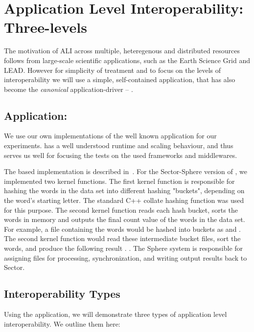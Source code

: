 \documentclass[3p,twocolumn]{elsarticle}
\begin{document}
\section{Application Level Interoperability: Three-levels}
\label{sec:interop}

The motivation of ALI across multiple, heteregenous and distributed
resources follows from large-scale scientific applications, such as
the Earth Science Grid and LEAD. However for simplicity of treatment
and to focus on the levels of interoperability we will use a simple,
self-contained application, that has also become the {\it canonical}
\mr application-driver -- \wc.

\subsection{Application: \Wc}
\label{ssec:app}

We use our own implementations of the well known \wc application for
our experiments.  \Wc has a well understood runtime and scaling
behaviour, and thus serves us well for focusing the tests on the used
frameworks and middlewares.

The \mr based \wc implementation is described in~\cite{saga_ccgrid09}.
For the Sector-Sphere version of \wc, we implemented two kernel
functions. The first kernel function is responsible for hashing the
words in the data set into different hashing "buckets", depending on
the word's starting letter.  The standard C++ collate hashing function
was used for this purpose.  The second kernel function reads each hash
bucket, sorts the words in memory and outputs the final count value of
the words in the data set.  For example, a file containing the words
 would be hashed into buckets as
 and .  The second kernel
function would read these intermediate bucket files, sort the words,
and produce the following result .  .  The Sphere system is responsible for assigning files for
processing, synchronization, and writing output results back to
Sector.

\subsection{Interoperability Types}

Using the \wc application, we will demonstrate three types of
application level interoperability. We outline them here:
\end{document}
